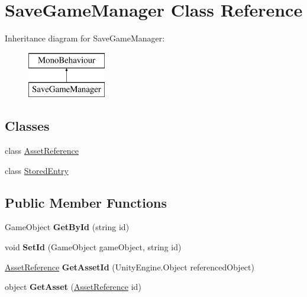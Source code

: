 \hypertarget{class_save_game_manager}{}\section{Save\+Game\+Manager Class Reference}
\label{class_save_game_manager}
Inheritance diagram for Save\+Game\+Manager\+:\begin{figure}[H]
\begin{center}
\leavevmode
\includegraphics[height=2.000000cm]{class_save_game_manager}
\end{center}
\end{figure}
\subsection*{Classes}
\begin{DoxyCompactItemize}
\item 
class \hyperlink{class_save_game_manager_1_1_asset_reference}{Asset\+Reference}
\item 
class \hyperlink{class_save_game_manager_1_1_stored_entry}{Stored\+Entry}
\end{DoxyCompactItemize}
\subsection*{Public Member Functions}
\begin{DoxyCompactItemize}
\item 
\mbox{\label{class_save_game_manager_a9d88574d43e62a55298406671983ce6f}} 
Game\+Object {\bfseries Get\+By\+Id} (string id)
\item 
\mbox{\label{class_save_game_manager_a2aefaa6bf188cc28dcc3abb054190ae7}} 
void {\bfseries Set\+Id} (Game\+Object game\+Object, string id)
\item 
\mbox{\label{class_save_game_manager_afcaad5363faff9659eb2bdf333d0c7a0}} 
\hyperlink{class_save_game_manager_1_1_asset_reference}{Asset\+Reference} {\bfseries Get\+Asset\+Id} (Unity\+Engine.\+Object referenced\+Object)
\item 
\mbox{\label{class_save_game_manager_adb67cfcda8b5ebc7a06daefcbe04a87e}} 
object {\bfseries Get\+Asset} (\hyperlink{class_save_game_manager_1_1_asset_reference}{Asset\+Reference} id)
\end{DoxyCompactItemize}
